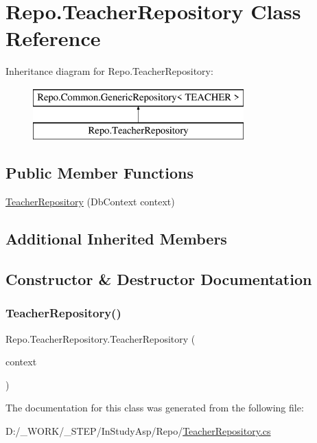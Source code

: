 \hypertarget{class_repo_1_1_teacher_repository}{}\section{Repo.\+Teacher\+Repository Class Reference}
\label{class_repo_1_1_teacher_repository}
Inheritance diagram for Repo.\+Teacher\+Repository\+:\begin{figure}[H]
\begin{center}
\leavevmode
\includegraphics[height=2.000000cm]{class_repo_1_1_teacher_repository}
\end{center}
\end{figure}
\subsection*{Public Member Functions}
\begin{DoxyCompactItemize}
\item 
\hyperlink{class_repo_1_1_teacher_repository_a632e6bc926978d77645253d3ada1a350}{Teacher\+Repository} (Db\+Context context)
\end{DoxyCompactItemize}
\subsection*{Additional Inherited Members}


\subsection{Constructor \& Destructor Documentation}
\mbox{\label{class_repo_1_1_teacher_repository_a632e6bc926978d77645253d3ada1a350}} 
\subsubsection{\texorpdfstring{Teacher\+Repository()}{TeacherRepository()}}
{\footnotesize\ttfamily Repo.\+Teacher\+Repository.\+Teacher\+Repository (\begin{DoxyParamCaption}\item[{Db\+Context}]{context }\end{DoxyParamCaption})}



The documentation for this class was generated from the following file\+:\begin{DoxyCompactItemize}
\item 
D\+:/\+\_\+\+W\+O\+R\+K/\+\_\+\+S\+T\+E\+P/\+In\+Study\+Asp/\+Repo/\hyperlink{_teacher_repository_8cs}{Teacher\+Repository.\+cs}\end{DoxyCompactItemize}
